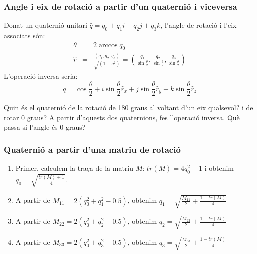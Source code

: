 \documentclass{beamer}
\begin{document}
\begin{frame}
  \frametitle{Angle i eix de rotació a partir d'un quaternió i viceversa}
  Donat un quaternió unitari $\hat{q}=q_0+q_1i+q_2j+q_3k$, l'angle de rotació i l'eix associats són:
  \begin{eqnarray*}
    \theta &=& 2 \arccos{q_0}\\
    \hat{r}&=& \frac{(q_1,q_2,q_3)}{\sqrt{(1-q_0^2)}} = \left(
    \frac{q_1}{\sin{\frac{\theta}{2}}},
    \frac{q_2}{\sin{\frac{\theta}{2}}},
    \frac{q_3}{\sin{\frac{\theta}{2}}}
    \right)
  \end{eqnarray*}
  L'operació inversa seria:
  \[
    q=\cos{\frac{\theta}{2}}+i\sin{\frac{\theta}{2}}\hat{r}_x+j\sin{\frac{\theta}{2}}\hat{r}_y+k\sin{\frac{\theta}{2}}\hat{r}_z
  \]
  \begin{exercici}{}
    Quin és el quaternió de la rotació de 180 graus al voltant d'un eix qualsevol? i de rotar 0 graus? A partir d'aquests dos quaternions, fes l'operació inversa. Què passa si l'angle és 0 graus?
  \end{exercici}
\end{frame}

\begin{frame}
  \frametitle{Quaternió a partir d'una matriu de rotació}
  \begin{enumerate}
    \item Primer, calculem la traça de la matriu $M$: $tr(M)=4q_0^2-1$ i obtenim $q_0=\sqrt{\frac{tr(M)+1}{4}}$.
    \item A partir de $M_{11}=2(q_0^2+q_1^2-0.5)$, obtenim $q_1=\sqrt{\frac{M_{11}}{2}+\frac{1-tr(M)}{4}}$
    \item A partir de $M_{22}=2(q_0^2+q_2^2-0.5)$, obtenim $q_2=\sqrt{\frac{M_{22}}{2}+\frac{1-tr(M)}{4}}$
    \item A partir de $M_{33}=2(q_0^2+q_3^2-0.5)$, obtenim $q_3=\sqrt{\frac{M_{33}}{2}+\frac{1-tr(M)}{4}}$
  \end{enumerate}
\end{frame}
\end{document}
